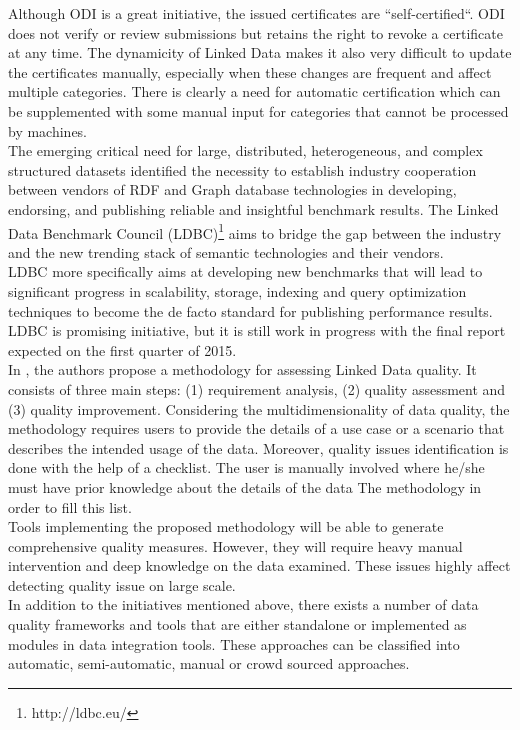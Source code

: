 \documentclass[onecolumn, crcready]{iosart2c}
\begin{document}
Although ODI is a great initiative, the issued certificates are “self-certified“. ODI does not verify or review submissions but retains the right to revoke a certificate at any time. The dynamicity of Linked Data  makes it also very difficult to update the certificates manually, especially when these changes are frequent and affect multiple categories. There is clearly a need for automatic certification which can be supplemented with some manual input for categories that cannot be processed by machines.\\

The emerging critical need for large, distributed, heterogeneous, and complex structured datasets identified the necessity to establish industry cooperation between vendors of RDF and Graph database technologies in developing, endorsing, and publishing reliable and insightful benchmark results. The Linked Data Benchmark Council (LDBC)\footnote{http://ldbc.eu/} aims to bridge the gap between the industry and the new trending stack of semantic technologies and their vendors. \\ LDBC more specifically aims at developing new benchmarks that will lead to significant progress in scalability, storage, indexing and query optimization techniques to become the de facto standard for publishing performance results. LDBC is promising initiative, but it is still work in progress with the final report expected on the first quarter of 2015.\\

In \cite{DBLP:conf/i-semantics/RulaZ14}, the authors propose a methodology for assessing Linked Data quality. It consists of three main steps: (1) requirement analysis, (2) quality assessment and (3) quality improvement. Considering the multidimensionality of data quality, the methodology requires users to provide the details of a use case or a scenario that describes the intended usage of the data. Moreover, quality issues identification is done with the help of a checklist. The user is manually involved where he/she must have prior knowledge about the details of the data The methodology in order to fill this list.\\
Tools implementing the proposed methodology will be able to generate comprehensive quality measures. However, they will require heavy manual intervention and deep knowledge on the data examined. These issues highly affect detecting quality issue on large scale.\\

In addition to the initiatives mentioned above, there exists a number of data quality frameworks and tools that are either standalone or implemented as modules in data integration tools. These approaches can be classified into automatic, semi-automatic, manual or crowd sourced approaches.\\
\end{document}
